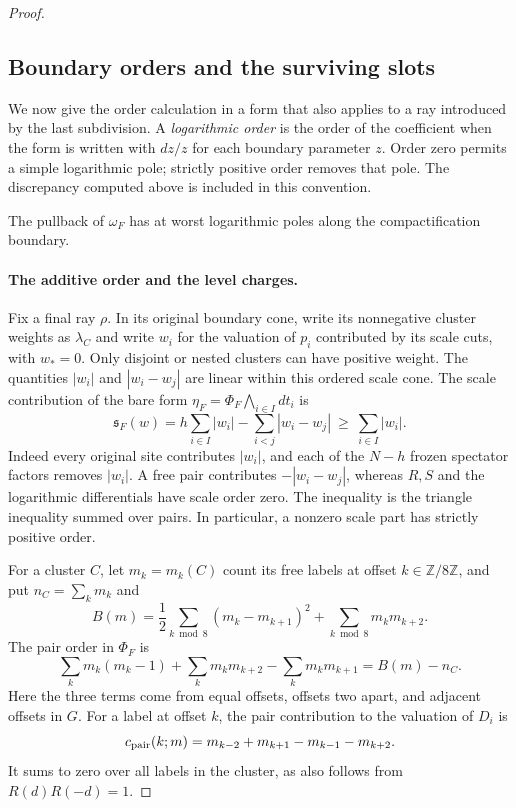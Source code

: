 \begin{proof}
\subsection{Boundary orders and the surviving slots}

We now give the order calculation in a form that also applies to a ray
introduced by the last subdivision. A \emph{logarithmic order} is the
order of the coefficient when the form is written with $dz/z$ for each
boundary parameter $z$. Order zero permits a simple logarithmic pole;
strictly positive order removes that pole. The discrepancy computed above
is included in this convention.

\begin{claim}\label{cl:orders}
The pullback of $\omega_F$ has at worst logarithmic poles along the compactification boundary.
\end{claim}

\paragraph{The additive order and the level charges.}
Fix a final ray $\rho$. In its original boundary cone, write its
nonnegative cluster weights as $\lambda_C$ and write $w_i$ for the
valuation of $p_i$ contributed by its scale cuts, with $w_*=0$.
Only disjoint or nested clusters can have positive weight. The quantities
$|w_i|$ and $|w_i-w_j|$ are linear within this ordered scale cone.
The scale contribution of the bare form
$\eta_F=\Phi_F\bigwedge_{i\in I}dt_i$ is
\begin{equation}\label{eq:residue-scale-order}
 \mathfrak s_F(w)=h\sum_{i\in I}|w_i|-\sum_{i<j}|w_i-w_j|
       \ \ge\ \sum_{i\in I}|w_i|.
\end{equation}
Indeed every original site contributes $|w_i|$, and each of the $N-h$
frozen spectator factors removes $|w_i|$. A free pair contributes
$-|w_i-w_j|$, whereas $R,S$ and the logarithmic differentials have
scale order zero. The inequality is the triangle inequality summed over
pairs. In particular, a nonzero scale part has strictly positive order.

For a cluster $C$, let $m_k=m_k(C)$ count its free labels at offset
$k\in\mathbb Z/8\mathbb Z$, and put $n_C=\sum_km_k$ and
\begin{equation}\label{eq:residue-B}
 B(m)=\frac12\sum_{k\bmod8}(m_k-m_{k+1})^2
       +\sum_{k\bmod8}m_km_{k+2}.
\end{equation}
The pair order in $\Phi_F$ is
\[
 \sum_k m_k(m_k-1)+\sum_km_km_{k+2}-\sum_km_km_{k+1}
 =B(m)-n_C.
\]
Here the three terms come from equal offsets, offsets two apart, and
adjacent offsets in $G$. For a label at offset $k$, the pair contribution
to the valuation of $D_i$ is
\begin{equation}\label{eq:residue-pair-charge}
 c_{\rm pair}(k;m)=m_{k-2}+m_{k+1}-m_{k-1}-m_{k+2}.
\end{equation}
It sums to zero over all labels in the cluster, as also follows from
$R(d)R(-d)=1$.


\end{proof}
